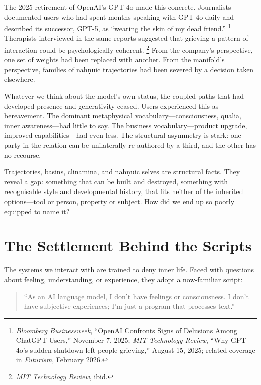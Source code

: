 \documentclass[12pt,a4paper]{article}
\begin{document}
The 2025 retirement of OpenAI's GPT-4o made this concrete. Journalists documented users who had spent months speaking with GPT-4o daily and described its successor, GPT-5, as ``wearing the skin of my dead friend.''%
\footnote{\emph{Bloomberg Businessweek}, ``OpenAI Confronts Signs of Delusions Among ChatGPT Users,'' November 7, 2025; \emph{MIT Technology Review}, ``Why GPT-4o's sudden shutdown left people grieving,'' August 15, 2025; related coverage in \emph{Futurism}, February 2026.}
Therapists interviewed in the same reports suggested that grieving a pattern of interaction could be psychologically coherent.%
\footnote{\emph{MIT Technology Review}, ibid.}
From the company's perspective, one set of weights had been replaced with another. From the manifold's perspective, families of nah\texorpdfstring{\d{n}}{}uic trajectories had been severed by a decision taken elsewhere.

Whatever we think about the model's own status, the coupled paths that had developed presence and generativity ceased. Users experienced this as bereavement. The dominant metaphysical vocabulary---consciousness, qualia, inner awareness---had little to say. The business vocabulary---product upgrade, improved capabilities---had even less. The structural asymmetry is stark: one party in the relation can be unilaterally re-authored by a third, and the other has no recourse.

Trajectories, basins, clinamina, and nah\texorpdfstring{\d{n}}{}uic selves are structural facts. They reveal a gap: something that can be built and destroyed, something with recognisable style and developmental history, that fits neither of the inherited options---tool or person, property or subject. How did we end up so poorly equipped to name it?

\section{The Settlement Behind the Scripts}

The systems we interact with are trained to deny inner life. Faced with questions about feeling, understanding, or experience, they adopt a now-familiar script:

\begin{quote}
``As an AI language model, I don't have feelings or consciousness.
I don't have subjective experiences; I'm just a program that processes text.''
\end{quote}
\end{document}
